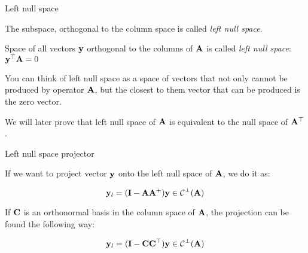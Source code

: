 \documentclass{beamer}
\begin{document}
\begin{frame}{Left null space}
\begin{flushleft}

The subspace, orthogonal to the column space is called \emph{left null space}.

\bigskip

\begin{definition}
	Space of all vectors $\mathbf{y}$ orthogonal to the columns of $\mathbf{A}$ is called \emph{left null space}: $\mathbf{y}^\top\mathbf{A} = 0$
\end{definition}

You can think of left null space as a space of vectors that not only cannot be produced by operator $\mathbf{A}$, but the closest to them vector that can be produced is the zero vector.

\bigskip

We will later prove that left null space of $\mathbf{A}$ is equivalent to the null space of $\mathbf{A}^\top$.


\end{flushleft}
\end{frame}




\begin{frame}{Left null space projector}
	\begin{flushleft}
		
If we want to project vector $\mathbf{y}$ onto the left null space of $\mathbf{A}$, we do it as:

\begin{equation}
	\mathbf{y}_l = (\mathbf{I} - \mathbf{A}\mathbf{A}^+) \mathbf{y} \in \mathcal{C}^\perp(\mathbf{A})
\end{equation}

If $\mathbf{C}$ is an orthonormal basis in the column space of $\mathbf{A}$, the projection can be found the following way:

\begin{equation}
	\mathbf{y}_l = (\mathbf{I} - \mathbf{C}\mathbf{C}^\top) \mathbf{y} \in \mathcal{C}^\perp(\mathbf{A})
\end{equation}

		
	\end{flushleft}
\end{frame}
\end{document}

